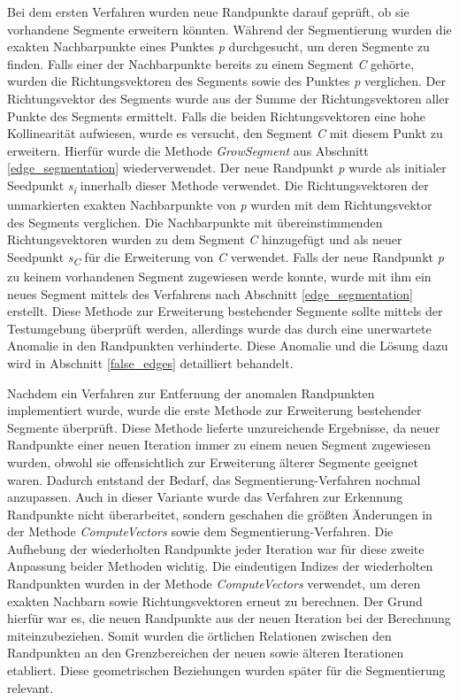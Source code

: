Bei dem ersten Verfahren wurden neue Randpunkte darauf geprüft, ob sie vorhandene Segmente erweitern könnten. Während der Segmentierung wurden die exakten Nachbarpunkte eines Punktes \textit{p} durchgesucht, um deren Segmente zu finden. Falls einer der Nachbarpunkte bereits zu einem Segment \textit{C} gehörte, wurden die Richtungsvektoren des Segments sowie des Punktes \textit{p} verglichen. Der Richtungsvektor des Segments wurde aus der Summe der Richtungsvektoren aller Punkte des Segments ermittelt. Falls die beiden Richtungsvektoren eine hohe Kollinearität aufwiesen, wurde es versucht, den Segment \textit{C} mit diesem Punkt zu erweitern. Hierfür wurde die Methode \textit{GrowSegment} aus Abschnitt \ref{edge_segmentation} wiederverwendet. Der neue Randpunkt \textit{p} wurde als initialer Seedpunkt \textit{s\textsubscript{i}} innerhalb dieser Methode verwendet. Die Richtungsvektoren der unmarkierten exakten Nachbarpunkte von \textit{p} wurden mit dem Richtungsvektor des Segments verglichen. Die Nachbarpunkte mit übereinstimmenden Richtungsvektoren wurden zu dem Segment \textit{C} hinzugefügt und als neuer Seedpunkt \textit{s\textsubscript{C}} für die Erweiterung von \textit{C} verwendet. Falls der neue Randpunkt \textit{p} zu keinem vorhandenen Segment zugewiesen werde konnte, wurde mit ihm ein neues Segment mittels des Verfahrens nach Abschnitt \ref{edge_segmentation} erstellt. Diese Methode zur Erweiterung bestehender Segmente sollte mittels der Testumgebung überprüft werden, allerdings wurde das durch eine unerwartete Anomalie in den Randpunkten verhinderte. Diese Anomalie und die Lösung dazu wird in Abschnitt \ref{false_edges} detailliert behandelt.

Nachdem ein Verfahren zur Entfernung der anomalen Randpunkten implementiert wurde, wurde die erste Methode zur Erweiterung bestehender Segmente überprüft. Diese Methode lieferte unzureichende Ergebnisse, da neuer Randpunkte einer neuen Iteration immer zu einem neuen Segment zugewiesen wurden, obwohl sie offensichtlich zur Erweiterung älterer Segmente geeignet waren. Dadurch entstand der Bedarf, das Segmentierung-Verfahren nochmal anzupassen. Auch in dieser Variante wurde das Verfahren zur Erkennung Randpunkte nicht überarbeitet, sondern geschahen die größten Änderungen in der Methode \textit{ComputeVectors} sowie dem Segmentierung-Verfahren. Die Aufhebung der wiederholten Randpunkte jeder Iteration war für diese zweite Anpassung beider Methoden wichtig. Die eindeutigen Indizes der wiederholten Randpunkten wurden in der Methode \textit{ComputeVectors} verwendet, um deren exakten Nachbarn sowie Richtungsvektoren erneut zu berechnen. Der Grund hierfür war es, die neuen Randpunkte aus der neuen Iteration bei der Berechnung miteinzubeziehen. Somit wurden die örtlichen Relationen zwischen den Randpunkten an den Grenzbereichen der neuen sowie älteren Iterationen etabliert. Diese geometrischen Beziehungen wurden später für die Segmentierung relevant. 

